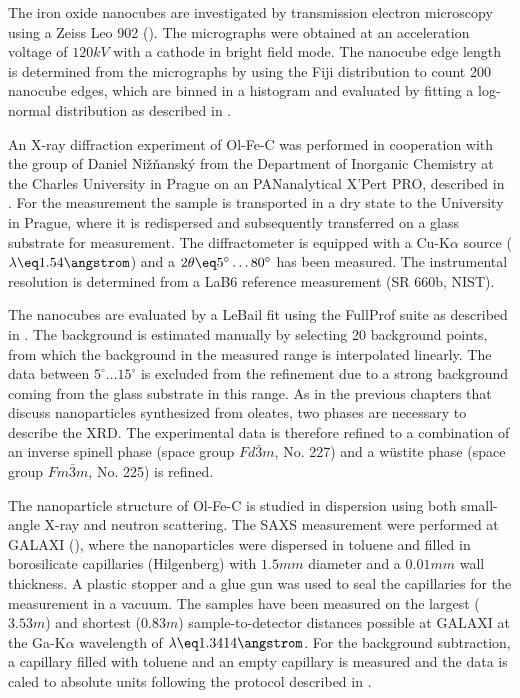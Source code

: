 \documentclass[\main/dresen_thesis.tex]{subfiles}
\begin{document}
    The iron oxide nanocubes are investigated by transmission electron microscopy using a Zeiss Leo 902 ().
    The micrographs were obtained at an acceleration voltage of $120 \unit{kV}$ with a  cathode in bright field mode.
    The nanocube edge length is determined from the micrographs by using the Fiji distribution \cite{Schindelin_2012_Fijia} to count 200 nanocube edges, which are binned in a histogram and evaluated by fitting a log-normal distribution as described in .

    An X-ray diffraction experiment of Ol-Fe-C was performed in cooperation with the group of Daniel Nižňanský from the Department of Inorganic Chemistry at the Charles University in Prague on an PANanalytical X'Pert PRO, described in .
    For the measurement the sample is transported in a dry state to the University in Prague, where it is redispersed and subsequently transferred on a glass substrate for measurement.
    The diffractometer is equipped with a Cu-K$\alpha$ source ($\lambda \eq 1.54 \angstrom$) and a $2 \theta \eq 5^\circ \ldots 80^\circ$ has been measured.
    The instrumental resolution is determined from a LaB6 reference measurement (SR 660b, NIST).

    The nanocubes are evaluated by a LeBail fit using the FullProf suite \cite{Rodriguez_1993_Recen} as described in .
    The background is estimated manually by selecting 20 background points, from which the background in the measured range is interpolated linearly.
    The data between $5 ^\circ \ldots 15 ^\circ$ is excluded from the refinement due to a strong background coming from the glass substrate in this range.
    As in the previous chapters that discuss nanoparticles synthesized from oleates, two phases are necessary to describe the XRD.
    The experimental data is therefore refined to a combination of an inverse spinell phase (space group $Fd\bar{3}m$, No. 227) and a w\"ustite phase (space group $Fm\bar{3}m$, No. 225) is refined.

    The nanoparticle structure of Ol-Fe-C is studied in dispersion using both small-angle X-ray and neutron scattering.
    The SAXS measurement were performed at GALAXI (), where the nanoparticles were dispersed in toluene and filled in borosilicate capillaries (Hilgenberg) with $1.5 \unit{mm}$ diameter and a $0.01 \unit{mm}$ wall thickness.
    A plastic stopper and a glue gun was used to seal the capillaries for the measurement in a vacuum.
    The samples have been measured on the largest ($3.53 \unit{m}$) and shortest ($0.83 \unit{m}$) sample-to-detector distances possible at GALAXI at the Ga-K$\alpha$ wavelength of $\lambda \eq 1.3414 \angstrom$.
    For the background subtraction, a capillary filled with toluene and an empty capillary is measured and the data is caled to absolute units following the protocol described in .
\end{document}
